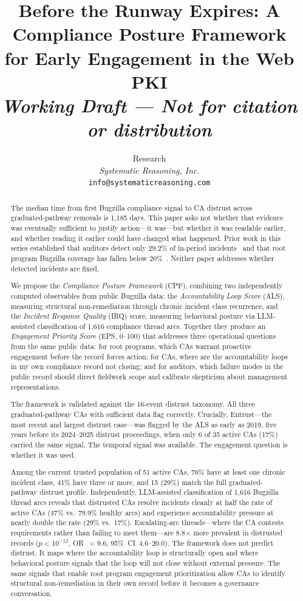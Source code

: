 \documentclass[10pt,twocolumn,letterpaper]{article}
\title{\Large\textbf{Before the Runway Expires: A Compliance Posture Framework\\for Early Engagement in the Web PKI}\\[0.5em]
\normalsize\textit{Working Draft --- Not for citation or distribution}}
\author{
Research\\
\textit{Systematic Reasoning, Inc.}\\
\texttt{info@systematicreasoning.com}
}
\date{}
\begin{document}
\maketitle

\begin{abstract}
The median time from first Bugzilla compliance signal to CA distrust across graduated-pathway
removals is 1,185 days. This paper asks not whether that evidence was eventually sufficient to
justify action---it was---but whether it was readable earlier, and whether reading it earlier
could have changed what happened. Prior work in this series established that auditors detect
only 29.2\% of in-period incidents~\cite{p1} and that root program Bugzilla coverage has
fallen below 20\%~\cite{p2}. Neither paper addresses whether detected incidents are fixed.

We propose the \textit{Compliance Posture Framework} (CPF), combining two independently
computed observables from public Bugzilla data: the \textit{Accountability Loop Score} (ALS),
measuring structural non-remediation through chronic incident class recurrence, and the
\textit{Incident Response Quality} (IRQ) score, measuring behavioral posture via LLM-assisted
classification of 1,616 compliance thread arcs. Together they produce an \textit{Engagement
Priority Score} (EPS, 0--100) that addresses three operational questions from the same
public data: for root programs, which CAs warrant proactive engagement before the record
forces action; for CAs, where are the accountability loops in my own compliance record
not closing; and for auditors, which failure modes in the public record should direct
fieldwork scope and calibrate skepticism about management representations.

The framework is validated against the 16-event distrust taxonomy. All three
graduated-pathway CAs with sufficient data flag correctly. Crucially, Entrust---the most
recent and largest distrust case---was flagged by the ALS as early as 2019, five years
before its 2024--2025 distrust proceedings, when only 6 of 35 active CAs (17\%) carried
the same signal. The temporal signal was available. The engagement question is whether it
was used.

Among the current trusted population of 51 active CAs, 76\% have at least one chronic
incident class, 41\% have three or more, and 15 (29\%) match the full graduated-pathway
distrust profile. Independently, LLM-assisted classification of 1,616 Bugzilla thread
arcs reveals that distrusted CAs resolve incidents cleanly at half the rate of active
CAs (47\% vs.\ 79.9\% healthy arcs) and experience accountability pressure at nearly
double the rate (29\% vs.\ 17\%). Escalating-arc threads---where the CA contests
requirements rather than failing to meet them---are 8.8$\times$ more prevalent in
distrusted records ($p < 10^{-12}$, OR~$=9.6$, 95\%~CI~4.6--20.0). The framework does not predict distrust.
It maps where the accountability loop is structurally open and where behavioral posture
signals that the loop will not close without external pressure. The same signals that
enable root program engagement prioritization allow CAs to identify structural
non-remediation in their own record before it becomes a governance conversation.
\end{abstract}
\end{document}
